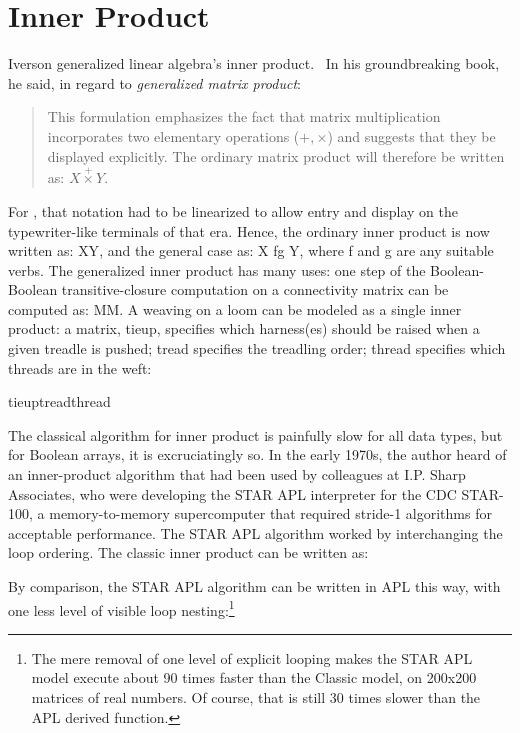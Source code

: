 \section{Inner Product}
\label{innerproduct}

Iverson generalized linear algebra's inner 
product.~\cite{Iverson62,KEIverson:tot}
In his groundbreaking book, he said, in regard to
{\em generalized matrix product}:

\begin{quote}
This formulation emphasizes the fact that matrix multiplication
incorporates two elementary operations (${+}, {\times}$) and 
suggests that they be displayed explicitly. The ordinary
matrix product will therefore be written as: 
$X \stackrel{+}{\times} Y$.
\end{quote}

For \ibmapl, that notation had to be linearized to allow entry
and display on the typewriter-like terminals of that era. 
Hence, the ordinary
inner product is now written as: {\apl X\qplus\qdot\qtimes\0Y},
and the general case as: {\apl X f\qdot\0g Y}, where {\apl f}
and {\apl g} are any suitable verbs.
The generalized inner product has many uses: one step
of the Boolean-Boolean transitive-closure computation on a connectivity matrix
can be computed as: {\apl M\qor\qdot\qand\0M}.
A weaving on a loom can be modeled as a single inner product: a matrix,
{\apl tieup}, specifies which harness(es) should be raised
when a given treadle is pushed; {\apl tread} specifies the
treadling order; {\apl thread} specifies which threads are
in the weft:

\medskip
{\apl tieup\qlbr\0tread\qsemic\qrbr\qor\qdot\qeq\0thread}
\medskip


The classical algorithm for inner product is painfully slow for all
data types, but for Boolean arrays, it is excruciatingly so.
In the early 1970s, the author heard of an inner-product algorithm
that had been used by colleagues at I.P. Sharp Associates,
who were developing the STAR APL interpreter for the CDC STAR-100, 
a memory-to-memory supercomputer that required stride-1
algorithms for acceptable performance. The STAR APL algorithm 
worked by interchanging the loop ordering. The classic inner product
can be written as:



\noindent By comparison, the STAR APL algorithm can be written
in APL this way, with one less level of visible loop 
nesting:\footnote{The mere removal of one level of explicit
looping makes the STAR APL model execute about 90 times
faster than the Classic model, on 200x200 matrices of
real numbers. Of course, that is still 30 times slower than
the APL derived function.}

